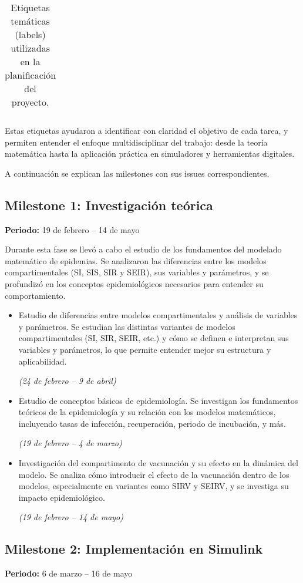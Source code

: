 \begin{table}[H]
\begin{tabular}{|p{4cm}|p{8cm}|}
    \end{tabular}
\caption{Etiquetas temáticas (labels) utilizadas en la planificación del proyecto.}
\label{tab:etiquetas}
\end{table}
Estas etiquetas ayudaron a identificar con claridad el objetivo de cada tarea, y permiten entender el enfoque multidisciplinar del trabajo: desde la teoría matemática hasta la aplicación práctica en simuladores y herramientas digitales.



A continuación se explican las milestones con sus issues  correspondientes.
\subsection{Milestone 1: Investigación teórica}
\textbf{Periodo:} 19 de febrero – 14 de mayo

Durante esta fase se llevó a cabo el estudio de los fundamentos del modelado matemático de epidemias. Se analizaron las diferencias entre los modelos compartimentales (SI, SIS, SIR y SEIR), sus variables y parámetros, y se profundizó en los conceptos epidemiológicos necesarios para entender su comportamiento.

\begin{itemize}
    \item Estudio de diferencias entre modelos compartimentales y análisis de variables y parámetros. Se estudian las distintas variantes de modelos compartimentales (SI, SIR, SEIR, etc.) y cómo se definen e interpretan sus variables y parámetros, lo que permite entender mejor su estructura y aplicabilidad. 
    
    \textit{(24 de febrero – 9 de abril)}
    \item Estudio de conceptos básicos de epidemiología. Se investigan los fundamentos teóricos de la epidemiología y su relación con los modelos matemáticos, incluyendo tasas de infección, recuperación, periodo de incubación, y más. 
    
    \textit{(19 de febrero – 4 de marzo)}
    \item Investigación del compartimento de vacunación y su efecto en la dinámica del modelo. Se analiza cómo introducir el efecto de la vacunación dentro de los modelos, especialmente en variantes como SIRV y SEIRV, y se investiga su impacto epidemiológico. 
    
    \textit{(19 de febrero – 14 de mayo)}
\end{itemize}

\subsection*{Milestone 2: Implementación en Simulink}
\textbf{Periodo:} 6 de marzo – 16 de mayo

